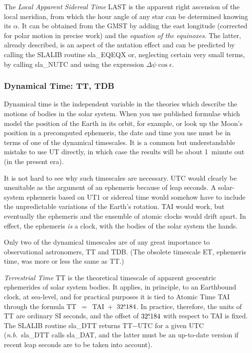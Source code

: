 \documentclass[11pt,twoside]{article}
\newcommand{\tseci}[1]   {$#1$\mbox{$^{\rm s}$}}
\newcommand{\tsec}[2]    {\tseci{#1}$\hspace{-0.3em}.#2$}
\renewcommand{\tsec}[2] {$#1^{\rm s}\hspace{-0.3em}.#2$}
\begin{document}
The {\it Local Apparent Sidereal Time}\/ LAST is the apparent right
ascension of the local meridian, from which the hour angle of any
star can be determined knowing its $\alpha$.  It can be obtained from the
GMST by adding the east longitude (corrected for polar motion
in precise work) and the {\it equation of the equinoxes}.  The
latter, already described, is an aspect of the nutation effect
and can be predicted by calling the SLALIB routine
sla\_EQEQX
or, neglecting certain very small terms, by calling
sla\_NUTC
and using the expression $\Delta\psi\cos\epsilon$.

\subsubsection{Dynamical Time: TT, TDB}
Dynamical time is the independent variable in the theories
which describe the motions of bodies in the solar system.  When
you use published formulae which model the position of the
Earth in its orbit, for example, or look up
the Moon's position in a precomputed ephemeris, the date and time
you use must be in terms of one of the dynamical timescales.  It
is a common but understandable mistake to use UT directly, in which
case the results will be about 1~minute out (in the present
era).

It is not hard to see why such timescales are necessary.
UTC would clearly be unsuitable as the argument of an
ephemeris because of leap seconds.
A solar-system ephemeris based on UT1 or sidereal time would somehow
have to include the unpredictable variations of the Earth's rotation.
TAI would work, but eventually
the ephemeris and the ensemble of atomic clocks would drift apart.
In effect, the ephemeris {\it is}\/ a clock, with the bodies of
the solar system the hands.

Only two of the dynamical timescales are of any great importance to
observational astronomers, TT and TDB.  (The obsolete
timescale ET, ephemeris time, was more or less the same as TT.)

{\it Terrestrial Time}\/ TT is
the theoretical timescale of apparent geocentric ephemerides of solar
system bodies.  It applies, in principle,
to an Earthbound clock, at sea-level, and for practical purposes
it is tied to
Atomic Time TAI through the formula TT~$=$~TAI~$+$~\tsec{32}{184}.
In practice, therefore, the units of TT are ordinary SI seconds, and
the offset of \tsec{32}{184} with respect to TAI is fixed.
The SLALIB routine
sla\_DTT
returns TT$-$UTC for a given UTC 
({\it n.b.}\  sla\_DTT
calls
sla\_DAT,
and the latter must be an up-to-date version if recent leap seconds are
to be taken into account).
\end{document}

